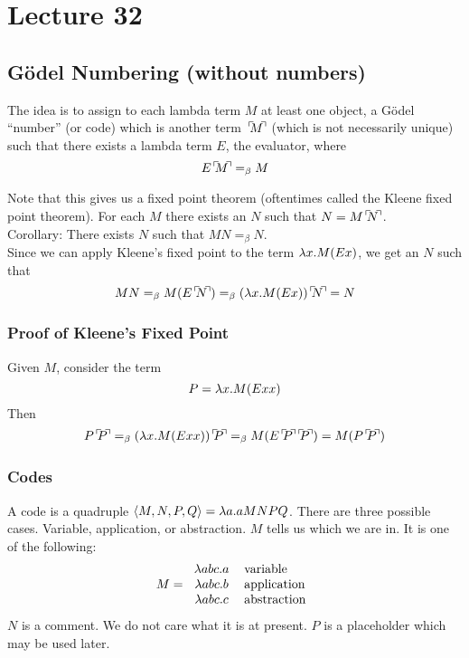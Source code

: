 \chapter{Lecture 32}

\section{G\"odel Numbering (without numbers)}
The idea is to assign to each lambda term $M$ at least one object, a G\"odel ``number'' (or code) which is another term $\godnum{M}$ (which is not necessarily unique) such that there exists a lambda term $E$, the evaluator, where
\begin{equation*}
  E\godnum{M} =_\beta M
\end{equation*}

Note that this gives us a fixed point theorem (oftentimes called the Kleene fixed point theorem). For each $M$ there exists an $N$ such that $N = M \godnum{N}$.\\

Corollary: There exists $N$ such that $MN =_\beta N$.\\

Since we can apply Kleene's fixed point to the term $\lambda x.M(Ex)$, we get an $N$ such that
\begin{equation*}
  MN =_\beta M(E\godnum{N}) =_\beta (\l x.M(Ex))\godnum{N} = N
\end{equation*}

\subsection{Proof of Kleene's Fixed Point}
Given $M$, consider the term
\begin{equation*}
  P = \lambda x.M(Exx)
\end{equation*}
Then
\begin{eqnarray*}
  P\godnum{P} =_\beta (\l x.M(Exx))\godnum{P} =_\beta M(E\godnum{P}\godnum{P}) = M(P\godnum{P})
\end{eqnarray*}

\subsection{Codes}
A code is a quadruple $\langle M,N,P,Q \rangle = \lambda a.aMNPQ$. There are three possible cases. Variable, application, or abstraction. $M$ tells us which we are in. It is one of the following:
\begin{eqnarray*}
  M = \begin{tabular}{c l}
    $\l abc.a$ & variable\\
    $\l abc.b$ & application\\
    $\l abc.c$ & abstraction\\
  \end{tabular}
\end{eqnarray*}
$N$ is a comment. We do not care what it is at present. $P$ is a placeholder which may be used later.\\

